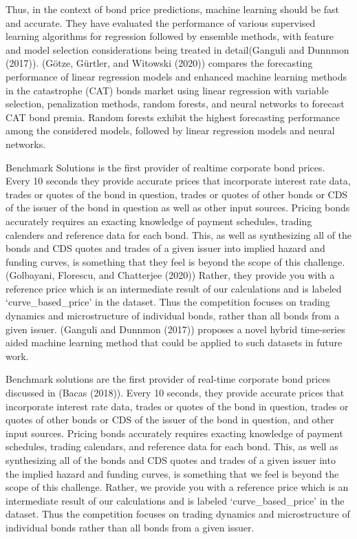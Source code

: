 \documentclass[
  man]{apa6}
\begin{document}
\par

Thus, in the context of bond price predictions, machine learning should be fast and accurate. They have evaluated the performance of various supervised learning algorithms for regression followed by ensemble methods, with feature and model selection considerations being treated in detail(Ganguli and Dunnmon (2017)). (Götze, Gürtler, and Witowski (2020)) compares the forecasting performance of linear regression models and enhanced machine learning methods in the catastrophe (CAT) bonds market using linear regression with variable selection, penalization methods, random forests, and neural networks to forecast CAT bond premia. Random forests exhibit the highest forecasting performance among the considered models, followed by linear regression models and neural networks.

\par

Benchmark Solutions is the first provider of realtime corporate bond prices. Every 10 seconds they provide accurate prices that incorporate interest rate data, trades or quotes of the bond in question, trades or quotes of other bonds or CDS of the issuer of the bond in question as well as other input sources. Pricing bonds accurately requires an exacting knowledge of payment schedules, trading calenders and reference data for each bond. This, as well as synthesizing all of the bonds and CDS quotes and trades of a given issuer into implied hazard and funding curves, is something that they feel is beyond the scope of this challenge. (Golbayani, Florescu, and Chatterjee (2020)) Rather, they provide you with a reference price which is an intermediate result of our calculations and is labeled `curve\_based\_price' in the dataset. Thus the competition focuses on trading dynamics and microstructure of individual bonds, rather than all bonds from a given issuer. (Ganguli and Dunnmon (2017)) proposes a novel hybrid time-series aided machine learning method that could be applied to such datasets in future work.

\par

Benchmark solutions are the first provider of real-time corporate bond prices discussed in (Bacas (2018)). Every 10 seconds, they provide accurate prices that incorporate interest rate data, trades or quotes of the bond in question, trades or quotes of other bonds or CDS of the issuer of the bond in question, and other input sources. Pricing bonds accurately requires exacting knowledge of payment schedules, trading calendars, and reference data for each bond. This, as well as synthesizing all of the bonds and CDS quotes and trades of a given issuer into the implied hazard and funding curves, is something that we feel is beyond the scope of this challenge. Rather, we provide you with a reference price which is an intermediate result of our calculations and is labeled `curve\_based\_price' in the dataset. Thus the competition focuses on trading dynamics and microstructure of individual bonds rather than all bonds from a given issuer.
\end{document}
